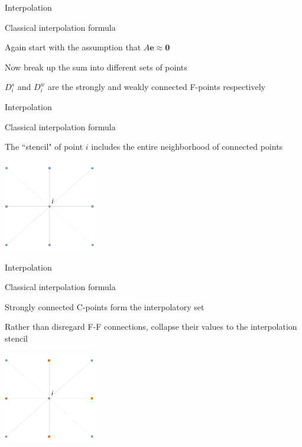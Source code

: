 \documentclass[18pt,xcolor=table]{beamer}
\begin{document}
\begin{frame}{Interpolation}
\begin{block}{Classical interpolation formula}
\bit
\item Again start with the assumption that $A\mathbf{e} \approx \mathbf{0}$
\item Now break up the sum into different sets of points
\item $D^s_i$ and $D^w_i$ are the strongly and weakly connected F-points respectively
\eit
\end{block}
\end{frame}


\begin{frame}{Interpolation}
\begin{block}{Classical interpolation formula}
\bit
\item The ``stencil" of point $i$ includes the entire neighborhood of connected points
\eit
\end{block}
\begin{center}
\includegraphics[width=0.3\textwidth]{../figures/interpStencil}
\end{center}
\end{frame}

\begin{frame}{Interpolation}
\begin{block}{Classical interpolation formula}
\bit
\item Strongly connected C-points form the interpolatory set
\item Rather than disregard F-F connections, collapse their values to the interpolation stencil
\eit
\end{block}
\begin{center}
\includegraphics[width=0.3\textwidth]{../figures/interpStencilCpts}
\end{center}
\end{frame}
\end{document}
